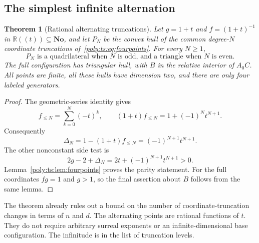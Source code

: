 \documentclass[11pt,a4paper]{article}
\numberwithin{equation}{section}
\newtheorem{theorem}{Theorem}[section]
\theoremstyle{plain}
\newcommand{\No}{\mathbf{No}}
\newcommand{\R}{\mathbb R}
\begin{document}
\subsection{The simplest infinite alternation}
\begin{theorem}[Rational alternating truncations]\label{poly:ts:thm:alternation}
Let $g=1+t$ and $f=(1+t)^{-1}$ in $\R((t))\subseteq\No$, and let
$P_N$ be the convex hull of the common degree-$N$ coordinate truncations
of~\eqref{poly:ts:eq:fourpoints}. For every $N\ge1$,
\[
 P_N\text{ is a quadrilateral when $N$ is odd, and a triangle when $N$ is even}.
\]
The full configuration has triangular hull, with $B$ in the relative
interior of $A_0C$. All points are finite, all these hulls have dimension
two, and there are only four labeled generators.
\end{theorem}
\begin{proof}
The geometric-series identity gives
\[
 f_{\le N}=\sum_{k=0}^N(-t)^k,
 \qquad
 (1+t)f_{\le N}=1+(-1)^N t^{N+1}.
\]
Consequently
\begin{equation}\label{poly:ts:eq:alternating-defect}
 \Delta_N=1-(1+t)f_{\le N}=(-1)^{N+1}t^{N+1}.
\end{equation}
The other nonconstant side test is
\[
 2g-2+\Delta_N=2t+(-1)^{N+1}t^{N+1}>0.
\]
Lemma~\ref{poly:ts:lem:fourpoints} proves the parity statement. For the full
coordinates $fg=1$ and $g>1$, so the final assertion about $B$ follows
from the same lemma.
\end{proof}

The theorem already rules out a bound on the number of coordinate-truncation
changes in terms of $n$ and $d$. The alternating points are rational
functions of $t$. They do not require arbitrary surreal exponents or an
infinite-dimensional base configuration. The infinitude is in the list of
truncation levels.
\end{document}
